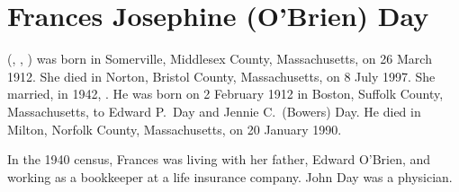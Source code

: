 \section{Frances Josephine (O'Brien) Day}\label{per:Frances4OBrien}

 (, , ) was born in Somerville, Middlesex County, Massachusetts, on 26 March 1912.\cite{Frances4OBrien2Birth} She died in Norton, Bristol County, Massachusetts, on 8 July 1997.\cite{Frances4OBrien2Death:1} She married, in 1942, .\cite{Frances4OBrien2Death:2} He was born on 2 February 1912 in Boston, Suffolk County, Massachusetts, to Edward P.\ Day and Jennie C.\ (Bowers) Day.\cite{JohnDaySS:1} He died in Milton, Norfolk County, Massachusetts, on 20 January 1990.\cite{JohnDaySS:2}

In the 1940 census, Frances was living with her father, Edward O'Brien, and working as a bookkeeper at a life insurance company.\cite{Census1940Frances4OBrien2} John Day was a physician.\cite{JohnDayObit}

